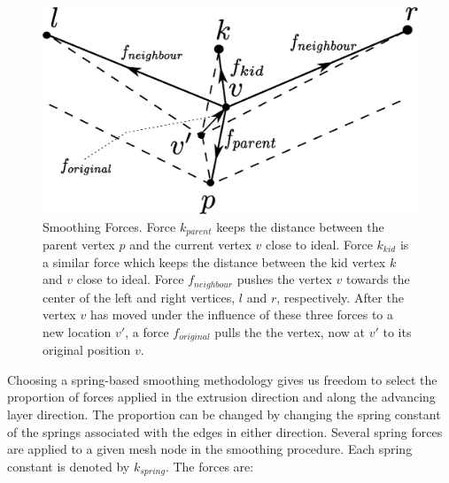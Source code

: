 \begin{figure}
\centering
\includegraphics[width=0.7\linewidth]{img/m2/smoothing/smoothing.eps}
\caption{Smoothing Forces. Force $k_{parent}$ keeps the distance between the parent vertex $p$ and the current vertex $v$ close to ideal. Force $k_{kid}$ is a similar force which keeps the distance between the kid vertex $k$ and $v$ close to ideal. Force $f_{neighbour}$ pushes the vertex $v$ towards the center of the left and right vertices, $l$ and $r$, respectively. After the vertex $v$ has moved under the influence of these three forces to a new location $v'$, a force $f_{original}$ pulls the the vertex, now at $v'$ to its original position $v$.}
\label{smoothingForces}
\end{figure}

Choosing a spring-based smoothing methodology gives us freedom to select the proportion of forces applied in the extrusion direction and along the advancing layer direction. The proportion can be changed by changing the spring constant of the springs associated with the edges in either direction. Several spring forces are applied to a given mesh node in the smoothing procedure. Each spring constant is denoted by $k_{spring}$. The forces are:


